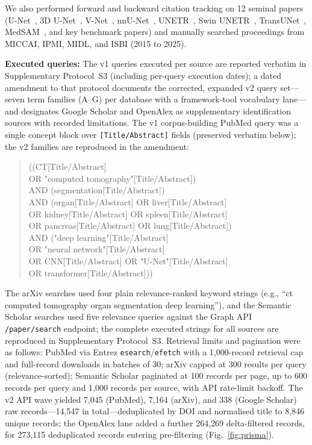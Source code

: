 We also performed forward and backward citation tracking on 12 seminal papers (U-Net~\cite{ronneberger2015unet}, 3D U-Net~\cite{cicek20163dunet}, V-Net~\cite{milletari2016vnet}, nnU-Net~\cite{isensee2021nnunet}, UNETR~\cite{hatamizadeh2022unetr}, Swin UNETR~\cite{swinunetr2022}, TransUNet~\cite{chen2024transunet}, MedSAM~\cite{ma2024medsam}, and key benchmark papers) and manually searched proceedings from MICCAI, IPMI, MIDL, and ISBI (2015 to 2025).

\textbf{Executed queries:} The v1 queries executed per source are reported verbatim in Supplementary Protocol~S3 (including per-query execution dates); a dated amendment to that protocol documents the corrected, expanded v2 query set---seven term families (A--G) per database with a framework-tool vocabulary lane---and designates Google Scholar and OpenAlex as supplementary identification sources with recorded limitations. The v1 corpus-building PubMed query was a single concept block over \texttt{[Title/Abstract]} fields (preserved verbatim below); the v2 families are reproduced in the amendment:

\begin{quote}
\scriptsize\ttfamily
((CT[Title/Abstract]\\
OR "computed tomography"[Title/Abstract])\\
AND (segmentation[Title/Abstract])\\
AND (organ[Title/Abstract] OR liver[Title/Abstract]\\
OR kidney[Title/Abstract] OR spleen[Title/Abstract]\\
OR pancreas[Title/Abstract] OR lung[Title/Abstract])\\
AND ("deep learning"[Title/Abstract]\\
OR "neural network"[Title/Abstract]\\
OR CNN[Title/Abstract] OR "U-Net"[Title/Abstract]\\
OR transformer[Title/Abstract]))
\end{quote}

The arXiv searches used four plain relevance-ranked keyword strings (e.g., ``ct computed tomography organ segmentation deep learning''), and the Semantic Scholar searches used five relevance queries against the Graph API \texttt{/paper/search} endpoint; the complete executed strings for all sources are reproduced in Supplementary Protocol~S3. Retrieval limits and pagination were as follows: PubMed via Entrez \texttt{esearch}/\texttt{efetch} with a 1{,}000-record retrieval cap and full-record downloads in batches of 30; arXiv capped at 300 results per query (relevance-sorted); Semantic Scholar paginated at 100 records per page, up to 600 records per query and 1{,}000 records per source, with API rate-limit backoff. The v2 API wave yielded 7{,}045 (PubMed), 7{,}164 (arXiv), and 338 (Google Scholar) raw records---14{,}547 in total---deduplicated by DOI and normalised title to 8{,}846 unique records; the OpenAlex lane added a further 264{,}269 delta-filtered records, for 273{,}115 deduplicated records entering pre-filtering (Fig.~\ref{fig:prisma}).

